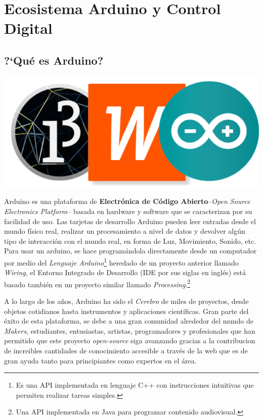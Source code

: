 \documentclass[letterpaper, 10pt]{report}
\begin{document}
	\chapter{Ecosistema Arduino y Control Digital}
	
	\section{?`Qué es Arduino?}
	
	\begin{center}
		\includegraphics[scale=0.3]{awpLogo.png}
	\end{center}

	Arduino es una plataforma de \textbf{Electrónica de Código Abierto}--\emph{Open Source Electronics Platform}-- basada en hardware y software que se caracterizan por su facilidad de uso. Las tarjetas de desarrollo Arduino pueden leer entradas desde el mundo físico real, realizar un procesamiento a nivel de datos y devolver algún tipo de interacción con el mundo real, en forma de Luz, Movimiento, Sonido, etc. Para usar un arduino, se hace programándola directamente desde un computador por medio del \emph{Lenguaje Arduino}\footnote{Es una API implementada en lenguaje C++ con instrucciones intuitivas que permiten realizar tareas simples.} heredado de un proyecto anterior llamado \emph{Wiring}, el Entorno Integrado de Desarrollo (IDE por sus siglas en inglés) está basado también en un proyecto similar llamado \emph{Processing}.\footnote{Una API implementada en Java para programar contenido audiovisual.}

A lo largo de los años, Arduino ha sido el \emph{Cerebro} de miles de proyectos, desde objetos cotidianos hasta instrumentos y aplicaciones científicas. Gran parte del éxito de esta plataforma, se debe a una gran comunidad alrededor del mundo de \emph{Makers}, estudiantes, entusiastas, artistas, programadores y profesionales que han permitido que este proyecto \emph{open-source} siga avanzando gracias a la contribucion de increibles cantidades de conocimiento accesible a través de la web que es de gran ayuda tanto para principiantes como expertos en el área.
 
\end{document}
